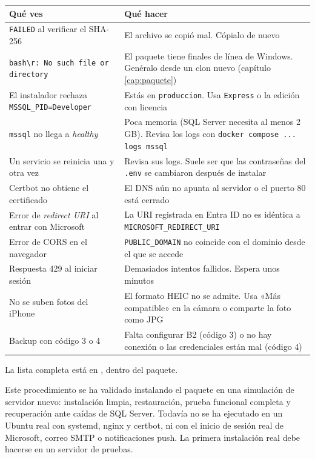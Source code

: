 \documentclass[11pt,a4paper,oneside]{report}
\newcommand{\cod}[1]{\texttt{\small #1}}
\newcommand{\cabecera}{\rowcolor{utaRojo!12}}
\begin{document}
\begin{center}
\small
\begin{tabularx}{\linewidth}{@{}P{5.2cm}L@{}}
\toprule
\cabecera \textbf{Qué ves} & \textbf{Qué hacer} \\
\midrule
\cod{FAILED} al verificar el SHA-256 & El archivo se copió mal. Cópialo de nuevo \\
\cod{bash\textbackslash r: No such file or directory} & El paquete tiene finales de línea de Windows. Genéralo desde un clon nuevo (capítulo \ref{cap:paquete}) \\
El instalador rechaza \cod{MSSQL\_PID=Developer} & Estás en \cod{produccion}. Usa \cod{Express} o la edición con licencia \\
\cod{mssql} no llega a \emph{healthy} & Poca memoria (SQL Server necesita al menos 2\,GB). Revisa los logs con \cod{docker compose ... logs mssql} \\
Un servicio se reinicia una y otra vez & Revisa sus logs. Suele ser que las contraseñas del \cod{.env} se cambiaron después de instalar \\
Certbot no obtiene el certificado & El DNS aún no apunta al servidor o el puerto 80 está cerrado \\
Error de \emph{redirect URI} al entrar con Microsoft & La URI registrada en Entra ID no es idéntica a \cod{MICROSOFT\_REDIRECT\_URI} \\
Error de CORS en el navegador & \cod{PUBLIC\_DOMAIN} no coincide con el dominio desde el que se accede \\
Respuesta 429 al iniciar sesión & Demasiados intentos fallidos. Espera unos minutos \\
No se suben fotos del iPhone & El formato HEIC no se admite. Usa «Más compatible» en la cámara o comparte la foto como JPG \\
Backup con código 3 o 4 & Falta configurar B2 (código 3) o no hay conexión o las credenciales están mal (código 4) \\
\bottomrule
\end{tabularx}
\end{center}

La lista completa está en , dentro del paquete.

\begin{nota}
Este procedimiento se ha validado instalando el paquete en una simulación de servidor nuevo: instalación
limpia, restauración, prueba funcional completa y recuperación ante caídas de SQL Server. Todavía no
se ha ejecutado en un Ubuntu real con systemd, nginx y certbot, ni con el inicio de sesión real de Microsoft,
correo SMTP o notificaciones push. La primera instalación real debe hacerse en un servidor de pruebas.
\end{nota}
\end{document}
